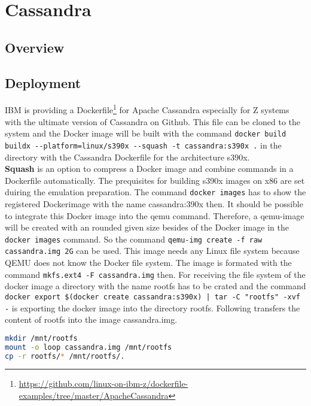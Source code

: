 \chapter{Cassandra}\label{ch:cassandra}

\section{Overview}

\section{Deployment}\label{Cassandra-Deployment}

IBM is providing a Dockerfile\footnote{\url{https://github.com/linux-on-ibm-z/dockerfile-examples/tree/master/ApacheCassandra}} for Apache Cassandra especially for Z systems with the ultimate version of Cassandra on Github. This file can be cloned to the system and the Docker image will be built with the command  \lstinline!docker build buildx --platform=linux/s390x --squash -t cassandra:s390x .! in the directory with the Cassandra Dockerfile  for the architecture s390x. \\
\textbf{Squash} is an option to compress a Docker image and combine commands in a Dockerfile automatically. The prequisites for building s390x images on x86 are set duiring the emulation preparation. The command \lstinline!docker images! has to show the registered Dockerimage with the name cassandra:390x then. It should be possible to integrate this Docker image into the qemu command. Therefore, a qemu-image will be created with an rounded given size besides of the Docker image in the  \lstinline!docker images! command. So the command  \lstinline!qemu-img create -f raw cassandra.img 2G! can be used. This image needs any Linux file system because QEMU does not know the Docker file system. The image is formated with the command  \lstinline!mkfs.ext4 -F cassandra.img! then. For receiving the file system of the docker image a directory with the name rootfs has to be crated and the command
\lstinline!docker export $(docker create cassandra:s390x) | tar -C "rootfs" -xvf -! is exporting the docker image into the directory rootfs. Following transfers the content of rootfs into the image cassandra.img.

\begin{lstlisting}[language=bash,caption={Mount rootfs},captionpos=b]
mkdir /mnt/rootfs
mount -o loop cassandra.img /mnt/rootfs
cp -r rootfs/* /mnt/rootfs/.
 \end{lstlisting}

